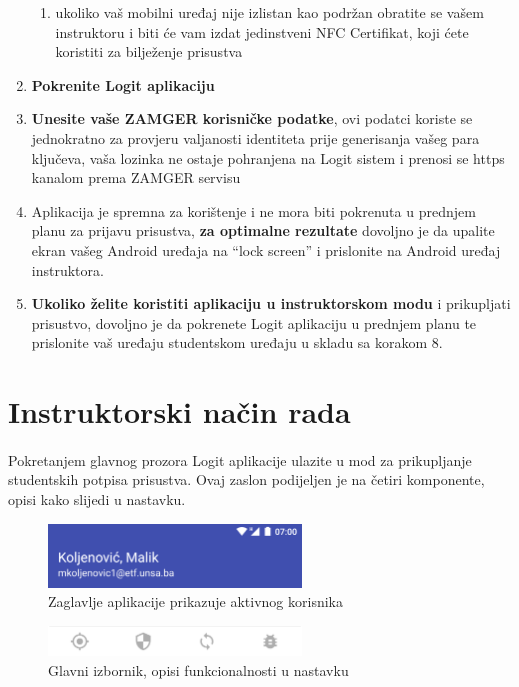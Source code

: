 \begin{enumerate}
    \begin{enumerate}
        \item ukoliko vaš mobilni uređaj nije izlistan kao podržan obratite se vašem instruktoru i biti će vam izdat jedinstveni NFC Certifikat, koji ćete koristiti za bilježenje prisustva
    \end{enumerate}
    \item \textbf{Pokrenite Logit aplikaciju}
    \item \textbf{Unesite vaše ZAMGER korisničke podatke}, ovi podatci koriste se jednokratno za provjeru valjanosti identiteta prije generisanja vašeg para ključeva, vaša lozinka ne ostaje pohranjena na Logit sistem i prenosi se https kanalom prema ZAMGER servisu
    \item Aplikacija je spremna za korištenje i ne mora biti pokrenuta u prednjem planu za prijavu prisustva, \textbf{za optimalne rezultate} dovoljno je da upalite ekran vašeg Android uređaja na “lock screen” i prislonite na Android uređaj instruktora.
    \item \textbf{Ukoliko želite koristiti aplikaciju u instruktorskom modu} i prikupljati prisustvo, dovoljno je da pokrenete Logit aplikaciju u prednjem planu te prislonite vaš uređaju studentskom uređaju u skladu sa korakom 8.
\end{enumerate}

\pagebreak[4]
\section{Instruktorski način rada}
\paragraph*{}
Pokretanjem glavnog prozora Logit aplikacije ulazite u mod za prikupljanje studentskih potpisa prisustva. Ovaj zaslon podijeljen je na četiri komponente, opisi kako slijedi u nastavku.

\begin{figure}[H]
    \centering
    \includegraphics[width=0.6\textwidth]{material/manual/01-head}
    \caption{Zaglavlje aplikacije prikazuje aktivnog korisnika}
\end{figure}

\begin{figure}[H]
    \centering
    \includegraphics[width=0.6\textwidth]{material/manual/02-menu}
    \caption{Glavni izbornik, opisi funkcionalnosti u nastavku}
\end{figure}

